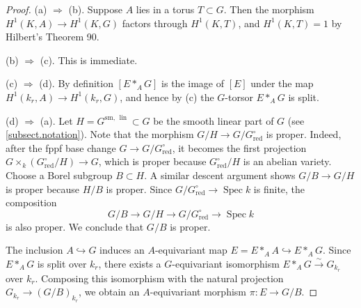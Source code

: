 \documentclass[12pt]{amsart}
\numberwithin{equation}{section}
\theoremstyle{remark}
\newcommand{\Spec}{\operatorname{Spec}}
\newcommand{\lin}{\operatorname{lin}}
\newcommand{\Glin}{G^{\mathrm{sm}, \, \lin}}
\begin{document}
\begin{proof}
(a) $\Longrightarrow$ (b). Suppose $A$ lies in a torus $T \subset G$. Then the morphism $H^1(K, A) \to H^1(K, G)$ factors through $H^1(K, T)$,
and $H^1(K, T) = 1$ by Hilbert's Theorem 90.

\smallskip
(b) $\Longrightarrow$ (c). This is immediate.
\smallskip

(c) $\Longrightarrow$ (d). By definition $[E*_AG]$ is the image of 
$[E]$ under the map $H^1(k_r, A) \to H^1(k_r, G)$, and hence by (c) the $G$-torsor $E*_AG$ is split.


\smallskip
(d) $\Longrightarrow$ (a). Let $H = \Glin \subset G$ be the smooth linear part of $G$ (see \ref{subsect.notation}).
 Note that the morphism $G/H \to G/G_{\mathrm{red}}^{\circ}$ is proper. Indeed, after the fppf base change $G\to G/G^{\circ}_{\mathrm{red}}$, it becomes the first projection $G\times_k (G^{\circ}_{\mathrm{red}}/H)\to G$, which is proper because  $G^{\circ}_{\mathrm{red}}/H$ is an abelian variety. Choose a Borel subgroup $B \subset H$. A similar descent argument shows $G/B \to G/H$  is proper because $H/B$ is proper. Since $G/G^{\circ}_{\mathrm{red}} \to \Spec k$ is finite, the composition
 $$G/B \to G/H \to G/G^{\circ}_{\mathrm{red}} \to \Spec k$$
 is also proper. We conclude that $G/B$ is proper.
 
The inclusion $A\hookrightarrow G$ induces an $A$-equivariant map $E=E*_AA\hookrightarrow E*_AG$. Since $E*_AG$ is split over $k_r$, there exists a $G$-equivariant isomorphism $E*_AG\xrightarrow{\sim} G_{k_r}$ over $k_r$. Composing this isomorphism with the natural projection $G_{k_r} \to (G/B)_{k_r}$, we obtain an $A$-equivariant morphism $\pi \colon E \to G/B$. 


\end{proof}
\end{document}
